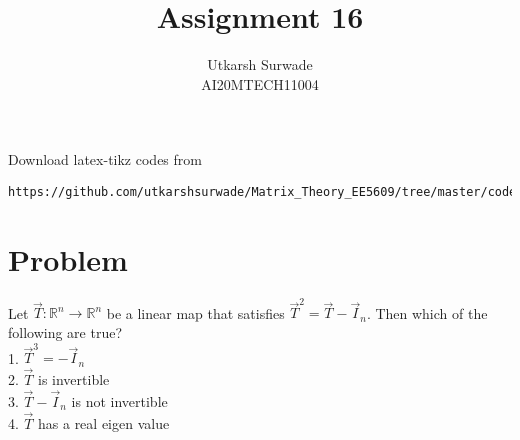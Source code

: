 \documentclass[journal,12pt]{IEEEtran}
\begin{document}
\def\putbox#1#2#3{\makebox[0in][l]{\makebox[#1][l]{}\raisebox{\baselineskip}[0in][0in]{\raisebox{#2}[0in][0in]{#3}}}}
     \def\rightbox#1{\makebox[0in][r]{#1}}
     \def\centbox#1{\makebox[0in]{#1}}
     \def\topbox#1{\raisebox{-\baselineskip}[0in][0in]{#1}}
     \def\midbox#1{\raisebox{-0.5\baselineskip}[0in][0in]{#1}}
\vspace{3cm}
\title{Assignment 16}
\author{Utkarsh Surwade\\AI20MTECH11004}
\maketitle
\bigskip
\renewcommand{\thefigure}{\theenumi}
\renewcommand{\thetable}{\theenumi}
Download latex-tikz codes from 
%
\begin{lstlisting}
https://github.com/utkarshsurwade/Matrix_Theory_EE5609/tree/master/codes
\end{lstlisting}
%
 
\section{\textbf{Problem}}
Let $\vec{T}:\mathbb{R}^n \rightarrow \mathbb{R}^n$ be a linear map that satisfies $\vec{T}^2=\vec{T}-\vec{I}_{n}$. Then which of the following are true?\\
1. $\vec{T}^3=-\vec{I}_{n}$\\
2. $\vec{T}$ is invertible\\
3. $\vec{T}-\vec{I}_{n}$ is not invertible\\
4. $\vec{T}$ has a real eigen value\\
\end{document}

